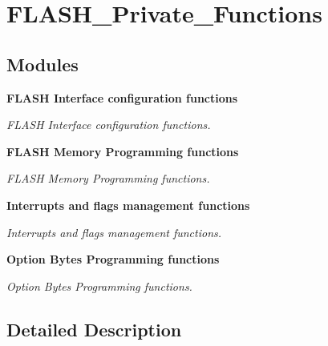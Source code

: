 \section{F\+L\+A\+S\+H\+\_\+\+Private\+\_\+\+Functions}
\label{group__FLASH__Private__Functions}
\subsection*{Modules}
\begin{DoxyCompactItemize}
\item 
\textbf{ F\+L\+A\+S\+H Interface configuration functions}
\begin{DoxyCompactList}\small\item\em F\+L\+A\+SH Interface configuration functions. \end{DoxyCompactList}\item 
\textbf{ F\+L\+A\+S\+H Memory Programming functions}
\begin{DoxyCompactList}\small\item\em F\+L\+A\+SH Memory Programming functions. \end{DoxyCompactList}\item 
\textbf{ Interrupts and flags management functions}
\begin{DoxyCompactList}\small\item\em Interrupts and flags management functions. \end{DoxyCompactList}\item 
\textbf{ Option Bytes Programming functions}
\begin{DoxyCompactList}\small\item\em Option Bytes Programming functions. \end{DoxyCompactList}\end{DoxyCompactItemize}


\subsection{Detailed Description}
